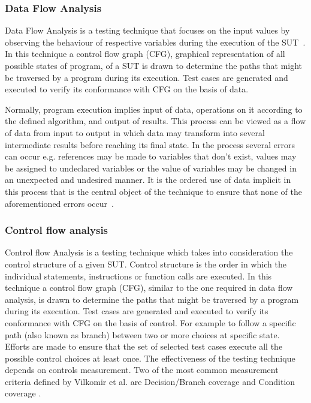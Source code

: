 {\subsubsection{Data Flow Analysis}
Data Flow Analysis is a testing technique that focuses on the input values by observing the behaviour of respective variables during the execution of the SUT~\cite{clarke1989formal}. In this technique a control flow graph (CFG), graphical representation of all possible states of program, of a SUT is drawn to determine the paths that might be traversed by a program during its execution. Test cases are generated and executed to verify its conformance with CFG on the basis of data. 

Normally, program execution implies input of data, operations on it according to the defined algorithm, and output of results. This process can be viewed as a flow of data from input to output in which data may transform into several intermediate results before reaching its final state. In the process several errors can occur e.g. references may be made to variables that don’t exist, values may be assigned to undeclared variables or the value of variables may be changed in an unexpected and undesired manner. It is the ordered use of data implicit in this process that is the central object of the technique to ensure that none of the aforementioned errors occur~\cite{fosdick1976data}.

\subsubsection{Control flow analysis}
Control flow Analysis is a testing technique which takes into consideration the control structure of a given SUT. Control structure is the order in which the individual statements, instructions or function calls are executed. In this technique a control flow graph (CFG), similar to the one required in data flow analysis, is drawn to determine the paths that might be traversed by a program during its execution. Test cases are generated and executed to verify its conformance with CFG on the basis of control. For example to follow a specific path (also known as branch) between two or more choices at specific state. Efforts are made to ensure that the set of selected test cases execute all the possible control choices at least once. The effectiveness of the testing technique depends on controls measurement. Two of the most common measurement criteria defined by Vilkomir et al. are Decision/Branch coverage and Condition coverage \cite{vilkomir2003tolerance}. 

}
